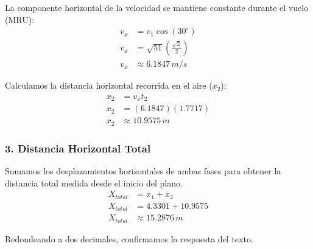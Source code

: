 \documentclass[12pt, a4paper]{article}
\begin{document}
La componente horizontal de la velocidad se mantiene constante durante el vuelo (MRU):
\begin{align*}
v_x &= v_1 \cos(30^\circ) \\
v_x &= \sqrt{51} \left(\frac{\sqrt{3}}{2}\right) \\
v_x &\approx 6.1847 \, \si{m/s}
\end{align*}

Calculamos la distancia horizontal recorrida en el aire ($x_2$):
\begin{align*}
x_2 &= v_x t_2 \\
x_2 &= (6.1847)(1.7717) \\
x_2 &\approx 10.9575 \, \si{m}
\end{align*}

\subsubsection*{3. Distancia Horizontal Total}
Sumamos los desplazamientos horizontales de ambas fases para obtener la distancia total medida desde el inicio del plano.
\begin{align*}
X_{total} &= x_1 + x_2 \\
X_{total} &= 4.3301 + 10.9575 \\
X_{total} &\approx 15.2876 \, \si{m}
\end{align*}

Redondeando a dos decimales, confirmamos la respuesta del texto.
\end{document}
